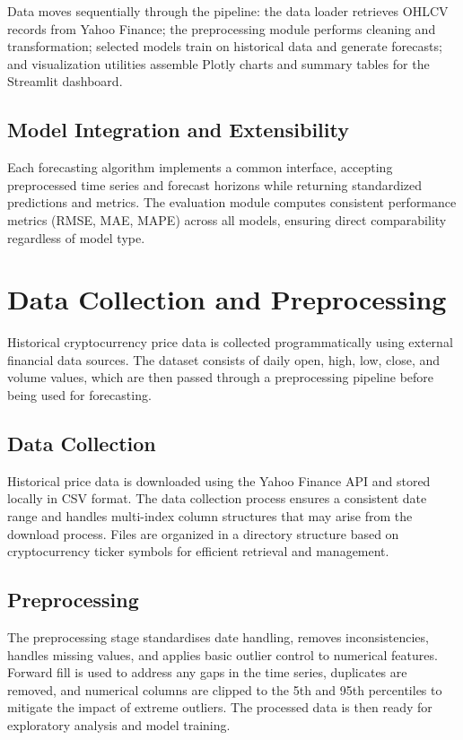 \documentclass[conference]{IEEEtran}
\begin{document}
Data moves sequentially through the pipeline: the data loader retrieves OHLCV records from Yahoo Finance; the preprocessing module performs cleaning and transformation; selected models train on historical data and generate forecasts; and visualization utilities assemble Plotly charts and summary tables for the Streamlit dashboard.

\subsection{Model Integration and Extensibility}

Each forecasting algorithm implements a common interface, accepting preprocessed time series and forecast horizons while returning standardized predictions and metrics. The evaluation module computes consistent performance metrics (RMSE, MAE, MAPE) across all models, ensuring direct comparability regardless of model type.

\section{Data Collection and Preprocessing}

Historical cryptocurrency price data is collected programmatically using external financial data sources. The dataset consists of daily open, high, low, close, and volume values, which are then passed through a preprocessing pipeline before being used for forecasting.

\subsection{Data Collection}
Historical price data is downloaded using the Yahoo Finance API and stored locally in CSV format. The data collection process ensures a consistent date range and handles multi-index column structures that may arise from the download process. Files are organized in a directory structure based on cryptocurrency ticker symbols for efficient retrieval and management.

\subsection{Preprocessing}
The preprocessing stage standardises date handling, removes inconsistencies, handles missing values, and applies basic outlier control to numerical features. Forward fill is used to address any gaps in the time series, duplicates are removed, and numerical columns are clipped to the 5th and 95th percentiles to mitigate the impact of extreme outliers. The processed data is then ready for exploratory analysis and model training.
\end{document}

